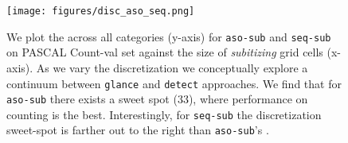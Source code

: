 \documentclass[10pt,twocolumn,letterpaper]{article}
\newcommand{\detect}{\texttt{detect}\xspace}
\newcommand{\sub}{\texttt{aso-sub}\xspace}
\newcommand{\seq}{\texttt{seq-sub}\xspace}
\newcommand{\glance}{\texttt{glance}\xspace}
\begin{document}
\begin{comment}

\begin{figure}
\texttt{[image: figures/continuum]}
\caption{We plot number of cells in a grid for associative subitizing (x-axis) vs mRMSE (y-axis). The shaded region represents the associative subitizing method, which conceptually interpolates between \glance{} and \detect{} approaches. We find that there exists a sweet spot, where performance on counting is the best.} \label{exp:sub-fig}
\vspace{-10pt}
\end{figure}


\subsection{Counting by Glancing (\glance):} As explained in Section.~\ref{sec:exp_setup}, we use: 1) classification vs. detection fine-tuned and 2) 1 hidden layer MLP vs. 2 hidden layer MLP models for \glance{}. On PASCAL we use hidden layers with 500 neurons in each hidden layer. In our COCO model, we replace the second hidden layer with 100 neurons. We find that the  \glance{}\texttt{-nofn-1L}\pdfcomment{what does no-fn-1L mean?} performs the consistently well across both the datasets. In general, additional layers seem to hurt on PASCAL, but not on COCO (probably because of more training data). More details can be found in the supplementary.
\end{comment}




\begin{figure}[t]
\centering
\texttt{[image: figures/disc\_aso\_seq.png]}
\vspace{-4pt}
\caption{\footnotesize{We plot the  across all categories (y-axis) for \sub and \seq on PASCAL Count-val set against the size of \emph{subitizing} grid cells (x-axis). As we vary the discretization we conceptually explore a
continuum between \glance{} and \detect{} approaches. We find that for \sub there exists a sweet spot (33), where performance on counting is the best. Interestingly, for \seq the discretization sweet-spot is farther out to the right than \sub's .}}
\label{exp:sub-fig}
\vspace{-20pt}
\end{figure}
\end{document}

